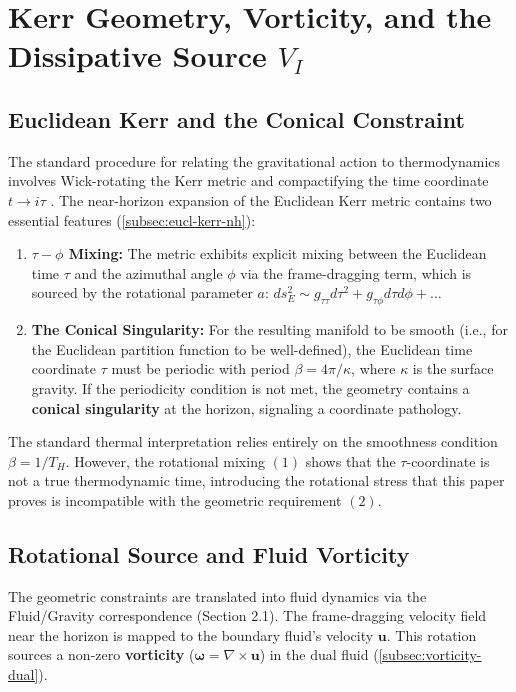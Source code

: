 \documentclass[11pt]{article}
\begin{document}
\section{Kerr Geometry, Vorticity, and the Dissipative Source $V_I$}

\subsection{Euclidean Kerr and the Conical Constraint}

The standard procedure for relating the gravitational action to thermodynamics involves Wick-rotating the Kerr metric\cite{Kerr1963} and compactifying the time coordinate $t \to i\tau$ \cite{GibbonsHawking1977}. The near-horizon expansion of the Euclidean Kerr metric\cite{Kerr1963} contains two essential features (\autoref{subsec:eucl-kerr-nh}):

\begin{enumerate}
    \item \textbf{$\tau-\phi$ Mixing:} The metric exhibits explicit mixing between the Euclidean time $\tau$ and the azimuthal angle $\phi$ via the frame-dragging term, which is sourced by the rotational parameter $a$: $ds^2_E \sim g_{\tau\tau} d\tau^2 + g_{\tau\phi} d\tau d\phi + \dots$
    \item \textbf{The Conical Singularity:} For the resulting manifold to be smooth (i.e., for the Euclidean partition function to be well-defined), the Euclidean time coordinate $\tau$ must be periodic with period $\beta = 4\pi/\kappa$, where $\kappa$ is the surface gravity. If the periodicity condition is not met, the geometry contains a \textbf{conical singularity} at the horizon, signaling a coordinate pathology.
\end{enumerate}

The standard thermal interpretation relies entirely on the smoothness condition $\beta = 1/T_H$. However, the rotational mixing $(1)$ shows that the $\tau$-coordinate is not a true thermodynamic time, introducing the rotational stress that this paper proves is incompatible with the geometric requirement $(2)$.

\subsection{Rotational Source and Fluid Vorticity}

The geometric constraints are translated into fluid dynamics via the Fluid/Gravity correspondence (Section 2.1). The frame-dragging velocity field near the horizon is mapped to the boundary fluid's velocity $\mathbf{u}$. This rotation sources a non-zero \textbf{vorticity} ($\mathbf{\omega} = \nabla \times \mathbf{u}$) in the dual fluid (\autoref{subsec:vorticity-dual}).
\end{document}
